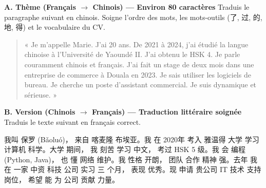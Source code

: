 \documentclass[11pt]{article}
\begin{document}
\begin{exercice}
\textbf{A. Thème (Français $\rightarrow$ Chinois) — Environ 80 caractères}
Traduis le paragraphe suivant en chinois. Soigne l'ordre des mots, les mots-outils (了, 过, 的, 地, 得) et le vocabulaire du CV.
\begin{quote}
« Je m'appelle Marie. J'ai 20 ans. De 2021 à 2024, j'ai étudié la langue chinoise à l'Université de Yaoundé II. J'ai obtenu le HSK 4. Je parle couramment chinois et français. J'ai fait un stage de deux mois dans une entreprise de commerce à Douala en 2023. Je sais utiliser les logiciels de bureau. Je cherche un poste d'assistant commercial. Je suis dynamique et sérieuse. »
\end{quote}

\textbf{B. Version (Chinois $\rightarrow$ Français) — Traduction littéraire soignée}
Traduis le texte suivant en français correct.
\begin{textebox}
我叫 保罗 (Bǎoluó)， 来自 喀麦隆 布埃亚。我 在 2020年 考入 雅温得 大学 学习 计算机 科学。大学 期间， 我 刻苦 学习 中文， 考过 HSK 5 级。我 会 编程 (Python, Java)， 也 懂 网络 维护。我 性格 开朗， 团队 合作 精神 强。去年 我 在 一家 中资 科技 公司 实习 三 个月， 表现 优秀。现 申请 贵公司 IT 技术 支持 岗位， 希望 能 为 公司 贡献 力量。
\end{textebox}
\end{exercice}
\end{document}

